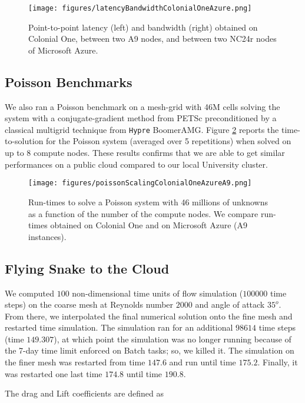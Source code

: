 \documentclass[12pt]{article}
\newcommand{\hypre}{\texttt{Hypre} }
\begin{document}
\begin{figure}[h!]
\centering
\texttt{[image: figures/latencyBandwidthColonialOneAzure.png]}
\caption{Point-to-point latency (left) and bandwidth (right) obtained on Colonial One, between two A9 nodes, and between two NC24r nodes of Microsoft Azure.}
\label{latency_bandwidth_colonialone_azure}
\end{figure}

\subsection{Poisson Benchmarks}

We also ran a Poisson benchmark on a mesh-grid with 46M cells solving the system with a conjugate-gradient method from PETSc preconditioned by a classical multigrid technique from \hypre BoomerAMG.
Figure \ref{poisson_colonialone_azurea9} reports the time-to-solution for the Poisson system (averaged over 5 repetitions) when solved on up to 8 compute nodes.
These results confirms that we are able to get similar performances on a public cloud compared to our local University cluster.

\begin{figure}[h!]
\centering
\texttt{[image: figures/poissonScalingColonialOneAzureA9.png]}
\caption{Run-times to solve a Poisson system with 46 millions of unknowns as a function of the number of the compute nodes. We compare run-times obtained on Colonial One and on Microsoft Azure (A9 instances).}
\label{poisson_colonialone_azurea9}
\end{figure}

\subsection{Flying Snake to the Cloud}

We computed $100$ non-dimensional time units of flow simulation ($100000$ time steps) on the coarse mesh at Reynolds number $2000$ and angle of attack $35^o$.
From there, we interpolated the final numerical solution onto the fine mesh and restarted time simulation.
The simulation ran for an additional $98614$ time steps (time $149.307$), at which point the simulation was no longer running because of the 7-day time limit enforced on Batch tasks; so, we killed it.
The simulation on the finer mesh was restarted from time $147.6$ and run until time $175.2$.
Finally, it was restarted one last time $174.8$ until time $190.8$.

The drag and Lift coefficients are defined as
\end{document}
